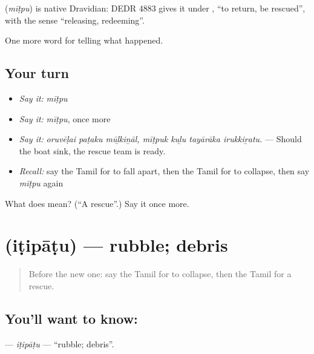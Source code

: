\begin{cousinweb}
\textbf{} (\emph{mīṭpu}) is native Dravidian: DEDR 4883 gives it under , \textquotedblleft{}to return, be rescued\textquotedblright{}, with the sense \textquotedblleft{}releasing, redeeming\textquotedblright{}.
\end{cousinweb}

\begin{grammarlens}[title={What you've built}]
One more word for telling what happened.
\end{grammarlens}

\subsection*{Your turn}
\begin{itemize}
\raggedright
  \item \emph{Say it:} \emph{mīṭpu}
  \item \emph{Say it:} \emph{mīṭpu}, once more
  \item \emph{Say it:} \emph{oruvēḷai paṭaku mūḻkiṉāl, mīṭpuk kuḻu tayārāka irukkiṟatu.} — Should the boat sink, the rescue team is ready.
  \item \emph{Recall:} say the Tamil for to fall apart, then the Tamil for to collapse, then say \emph{mīṭpu} again
\end{itemize}

\begin{tcolorbox}[breakable,colback=teal!4,colframe=teal!35!black,title={Before you move on}]
What does  mean? (\textquotedblleft{}A rescue\textquotedblright{}.) Say it once more.
\end{tcolorbox}
\section[\texorpdfstring{\ta{இடிபாடு} (iṭipāṭu)}{இடிபாடு (iṭipāṭu)}]{ (iṭipāṭu) — rubble; debris}

\label{lesson:TA-C301-itipatu}



\begin{quote}
Before the new one: say the Tamil for to collapse, then the Tamil for a rescue.
\end{quote}

\subsection*{You'll want to know: }
\textbf{} — \emph{iṭipāṭu} — \textquotedblleft{}rubble; debris\textquotedblright{}.

